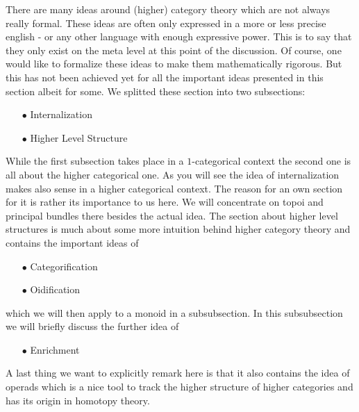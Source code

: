 There are many ideas around (higher) category theory which are not always really formal. These ideas are often only expressed in a more or less precise english - or any other language with enough expressive power. This is to say that they only exist on the meta level at this point of the discussion. Of course, one would like to formalize these ideas to make them mathematically rigorous. But this has not been achieved yet for all the important ideas presented in this section albeit for some. We splitted these section into two subsections:
\begin{enumerate}
\item[$\bullet$]
Internalization
\item[$\bullet$]
Higher Level Structure
\end{enumerate}
While the first subsection takes place in a $1$-categorical context the second one is all about the higher categorical one. As you will see the idea of internalization makes also sense in a higher categorical context. The reason for an own section for it is rather its importance to us here. We will concentrate on topoi and principal bundles there besides the actual idea. The section about higher level structures is much about some more intuition behind higher category theory and contains the important ideas of
\begin{enumerate}
\item[$\bullet$]
Categorification
\item[$\bullet$]
Oidification
\end{enumerate}
which we will then apply to a monoid in a subsubsection. In this subsubsection we will briefly discuss the further idea of
\begin{enumerate}
\item[$\bullet$]
Enrichment
\end{enumerate}
A last thing we want to explicitly remark here is that it also contains the idea of operads which is a nice tool to track the higher structure of higher categories and has its origin in homotopy theory.
